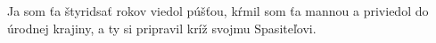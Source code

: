 Ja som ťa štyridsať rokov viedol púšťou,
kŕmil som ťa mannou a priviedol do úrodnej krajiny,
a ty si pripravil kríž svojmu Spasiteľovi.